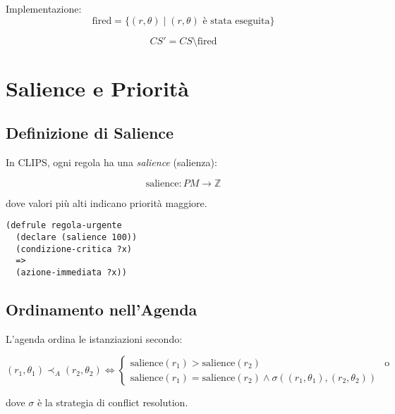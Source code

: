 Implementazione:
\begin{equation}
\text{fired} = \{(r, \theta) \mid (r, \theta) \text{ è stata eseguita}\}
\end{equation}

\begin{equation}
CS' = CS \setminus \text{fired}
\end{equation}

\section{Salience e Priorità}

\subsection{Definizione di Salience}

In CLIPS, ogni regola ha una \textit{salience} (salienza):

\begin{equation}
\text{salience}: PM \to \mathbb{Z}
\end{equation}

dove valori più alti indicano priorità maggiore.

\begin{esempio}
\begin{lstlisting}[language=CLIPS]
(defrule regola-urgente
  (declare (salience 100))
  (condizione-critica ?x)
  =>
  (azione-immediata ?x))
\end{lstlisting}
\end{esempio}

\subsection{Ordinamento nell'Agenda}

L'agenda ordina le istanziazioni secondo:

\begin{equation}
(r_1, \theta_1) \prec_A (r_2, \theta_2) \Leftrightarrow 
\begin{cases}
\text{salience}(r_1) > \text{salience}(r_2) & \text{o}\\
\text{salience}(r_1) = \text{salience}(r_2) \land \sigma((r_1, \theta_1), (r_2, \theta_2)) & 
\end{cases}
\end{equation}

dove $\sigma$ è la strategia di conflict resolution.

